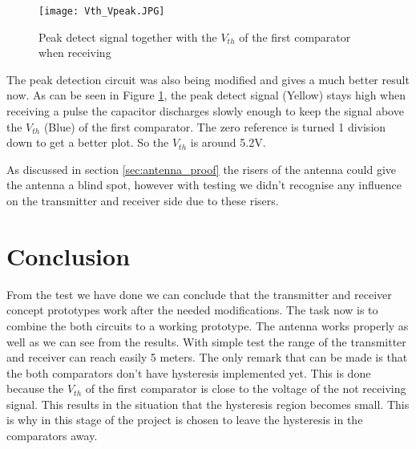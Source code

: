 \begin{figure}[H]
\centering
\texttt{[image: Vth\_Vpeak.JPG]}
\caption{Peak detect signal together with the $V_{th}$ of the first comparator when receiving}\label{fig:peakvth}
\end{figure}

The peak detection circuit was also being modified and gives a much better result now. As can be seen in Figure \ref{fig:peakvth}, the peak detect signal (Yellow) stays high when receiving a pulse the capacitor discharges slowly enough to keep the signal above the $V_{th}$ (Blue) of the first comparator. The zero reference is turned 1 division down to get a better plot. So the $V_{th}$ is around 5.2V.

As discussed in section \ref{sec:antenna_proof} the risers of the antenna could give the antenna a blind spot, however with testing we didn't recognise any influence on the transmitter and receiver side due to these risers.

\section{Conclusion}
From the test we have done we can conclude that the transmitter and receiver concept prototypes work after the needed modifications. The task now is to combine the both circuits to a working prototype.
The antenna works properly as well as we can see from the results. With simple test the range of the transmitter and receiver can reach easily 5 meters.
The only remark that can be made is that the both comparators don't have hysteresis implemented yet. This is done because the $V_{th}$ of the first comparator is close to the voltage of the not receiving signal. This results in the situation that the hysteresis region becomes small. This is why in this stage of the project is chosen to leave the hysteresis in the comparators away.
